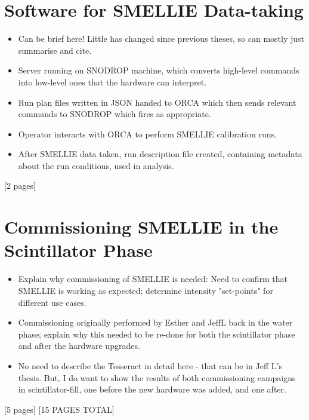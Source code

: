 \section{Software for SMELLIE Data-taking}

{
\color{blue}
\begin{itemize}
    \item Can be brief here! Little has changed since previous theses, so can mostly just summarise and cite.
    \item Server running on SNODROP machine, which converts high-level commands into low-level ones that the hardware can interpret.
    \item Run plan files written in JSON handed to ORCA which then sends relevant commands to SNODROP which fires as appropriate.
    \item Operator interacts with ORCA to perform SMELLIE calibration runs.
    \item After SMELLIE data taken, run description file created, containing metadata about the run conditions, used in analysis.
\end{itemize}
[2 pages]
\section[Commissioning SMELLIE in the Scintillator Phase]{Commissioning SMELLIE in the\\ Scintillator Phase}
\begin{itemize}
    \item Explain why commissioning of SMELLIE is needed: Need to confirm that SMELLIE is working as expected; determine intensity "set-points" for different use cases.
    \item Commissioning originally performed by Esther and JeffL back in the water phase; explain why this needed to be re-done for both the scintillator phase and after the hardware upgrades.
    \item No need to describe the Tesseract in detail here - that can be in Jeff L's thesis. But, I do want to show the results of both commissioning campaigns in scintillator-fill, one before the new hardware was added, and one after.
\end{itemize}
[5 pages]
[15 PAGES TOTAL]
}